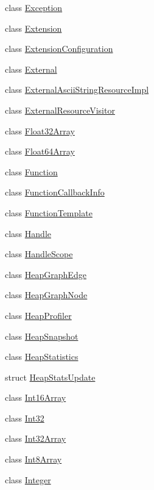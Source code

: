 \begin{DoxyCompactItemize}
\item 
class \hyperlink{classv8_1_1_exception}{Exception}
\item 
class \hyperlink{classv8_1_1_extension}{Extension}
\item 
class \hyperlink{classv8_1_1_extension_configuration}{Extension\+Configuration}
\item 
class \hyperlink{classv8_1_1_external}{External}
\item 
class \hyperlink{classv8_1_1_external_ascii_string_resource_impl}{External\+Ascii\+String\+Resource\+Impl}
\item 
class \hyperlink{classv8_1_1_external_resource_visitor}{External\+Resource\+Visitor}
\item 
class \hyperlink{classv8_1_1_float32_array}{Float32\+Array}
\item 
class \hyperlink{classv8_1_1_float64_array}{Float64\+Array}
\item 
class \hyperlink{classv8_1_1_function}{Function}
\item 
class \hyperlink{classv8_1_1_function_callback_info}{Function\+Callback\+Info}
\item 
class \hyperlink{classv8_1_1_function_template}{Function\+Template}
\item 
class \hyperlink{classv8_1_1_handle}{Handle}
\item 
class \hyperlink{classv8_1_1_handle_scope}{Handle\+Scope}
\item 
class \hyperlink{classv8_1_1_heap_graph_edge}{Heap\+Graph\+Edge}
\item 
class \hyperlink{classv8_1_1_heap_graph_node}{Heap\+Graph\+Node}
\item 
class \hyperlink{classv8_1_1_heap_profiler}{Heap\+Profiler}
\item 
class \hyperlink{classv8_1_1_heap_snapshot}{Heap\+Snapshot}
\item 
class \hyperlink{classv8_1_1_heap_statistics}{Heap\+Statistics}
\item 
struct \hyperlink{structv8_1_1_heap_stats_update}{Heap\+Stats\+Update}
\item 
class \hyperlink{classv8_1_1_int16_array}{Int16\+Array}
\item 
class \hyperlink{classv8_1_1_int32}{Int32}
\item 
class \hyperlink{classv8_1_1_int32_array}{Int32\+Array}
\item 
class \hyperlink{classv8_1_1_int8_array}{Int8\+Array}
\item 
class \hyperlink{classv8_1_1_integer}{Integer}

\end{DoxyCompactItemize}
